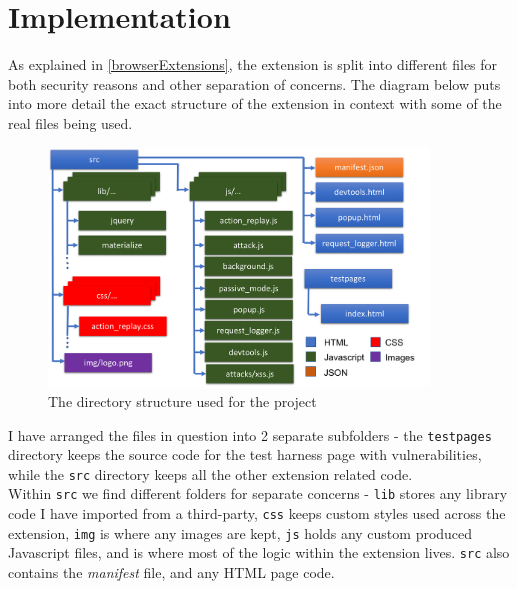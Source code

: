 \chapter{Implementation}



As explained in \ref{browserExtensions}, the extension is split into different files for both security reasons and other separation of concerns.
The diagram below puts into more detail the exact structure of the extension in context with some of the real files being used.


\begin{figure}[h]
	\centering
	\includegraphics[width=0.9\textwidth]{images/project_structure.png}
	\caption{The directory structure used for the project}
	\label{fig:test}
\end{figure}

I have arranged the files in question into 2 separate subfolders - the \texttt{testpages} directory keeps the source code for the test harness page with vulnerabilities, while the \texttt{src} directory keeps all the other extension related code. \\

Within \texttt{src} we find different folders for separate concerns - \texttt{lib} stores any library code I have imported from a third-party, \texttt{css} keeps custom styles used across the extension, \texttt{img} is where any images are kept, \texttt{js} holds any custom produced Javascript files, and is where most of the logic within the extension lives. \texttt{src} also contains the \textit{manifest} file, and any HTML page code. 

